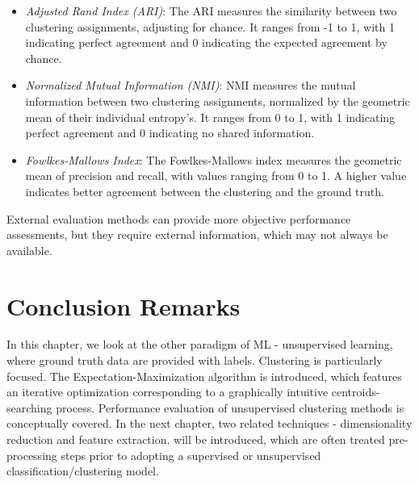 \documentclass[12pt]{article}
\begin{document}
    \begin{itemize}
      \item \textit{Adjusted Rand Index (ARI)}: The ARI measures the similarity between two clustering assignments, adjusting for chance. It ranges from -1 to 1, with 1 indicating perfect agreement and 0 indicating the expected agreement by chance.
      \item \textit{Normalized Mutual Information (NMI)}: NMI measures the mutual information between two clustering assignments, normalized by the geometric mean of their individual entropy's. It ranges from 0 to 1, with 1 indicating perfect agreement and 0 indicating no shared information.
      \item \textit{Fowlkes-Mallows Index}: The Fowlkes-Mallows index measures the geometric mean of precision and recall, with values ranging from 0 to 1. A higher value indicates better agreement between the clustering and the ground truth.
    \end{itemize}
  External evaluation methods can provide more objective performance assessments, but they require external information, which may not always be available.

\section{Conclusion Remarks}
In this chapter, we look at the other paradigm of ML - unsupervised learning, where ground truth data are provided with labels. Clustering is particularly focused. The Expectation-Maximization algorithm is introduced, which features an iterative optimization corresponding to a graphically intuitive centroids-searching process. Performance evaluation of unsupervised clustering methods is conceptually covered. In the next chapter, two related techniques - dimensionality reduction and feature extraction, will be introduced, which are often treated pre-processing steps prior to adopting a supervised or unsupervised classification/clustering model. 
\end{document}
